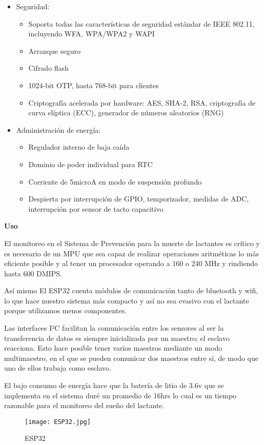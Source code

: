 \begin{itemize}
\begin{itemize}
          \end{itemize}
    \item Seguridad:
          \begin{itemize}
              \item Soporta todas las características de seguridad estándar de IEEE 802.11, incluyendo WFA, WPA/WPA2 y WAPI
              \item Arranque seguro
              \item Cifrado flash
              \item 1024-bit OTP, hasta 768-bit para clientes
              \item Criptografía acelerada por hardware: AES, SHA-2, RSA, criptografía de curva elíptica (ECC), generador de números aleatorios (RNG)
          \end{itemize}
    \item Administración de energía:
          \begin{itemize}
              \item Regulador interno de baja caída
              \item Dominio de poder individual para RTC
              \item Corriente de 5microA en modo de suspensión profundo
              \item Despierta por interrupción de GPIO, temporizador, medidas de ADC, interrupción por sensor de tacto capacitivo
          \end{itemize}
\end{itemize}

\textbf{Uso}

El monitoreo en el Sistema de Prevención para la muerte de lactantes es crítico y es necesario de un MPU que sea capaz de realizar operaciones aritméticas lo más eficiente posible y al tener un procesador operando a 160 o 240 MHz y rindiendo hasta 600 DMIPS.

Así mismo El ESP32 cuenta módulos de comunicación tanto de bluetooth y wifi, lo que hace nuestro sistema más compacto y así no sea evasivo con el lactante porque utilizamos menos componentes.

Las interfaces I²C facilitan la comunicación entre los sensores al ser la transferencia de datos es siempre inicializada por un maestro; el esclavo reacciona. Esto hace posible tener varios maestros mediante un modo multimaestro, en el que se pueden comunicar dos maestros entre sí, de modo que uno de ellos trabaja como esclavo.

El bajo consumo de energía hace que la batería de litio de 3.6v que se implementa en el sistema duré un promedio de 16hrs lo cual es un tiempo razonable para el monitoreo del sueño del lactante.
\begin{figure}[htp!]
    \centering
    \texttt{[image: ESP32.jpg]}
    \caption{ESP32}
    \label{fig: esp32}
\end{figure}\FloatBarrier
